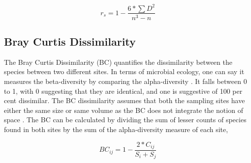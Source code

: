 $$r_{s} = 1 - \frac{6 * \sum D^{2}}{n^{3} - n}$$

\subsection{Bray Curtis Dissimilarity}
The Bray Curtis Dissimilarity (BC) quantifies the dissimilarity between the species between two different sites. In terms of microbial ecology, one can say it measures the beta-diversity by comparing the alpha-diversity \cite{zhang_2019_the}. It falls between 0 to 1, with 0 suggesting that they are identical, and one is suggestive of 100 per cent dissimilar. The BC dissimilarity assumes that both the sampling sites have either the same size or same volume as the BC does not integrate the notion of space \cite{zhang_2019_the}. The BC can be calculated by dividing the sum of lesser counts of species found in both sites by the sum of the alpha-diversity measure of each site,

$$BC_{ij} = 1 - \frac{2 * C_{ij}}{S_{i} + S_{j}}$$